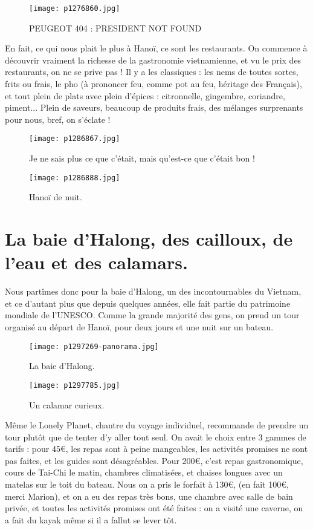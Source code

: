 \documentclass{book}
\begin{document}
\begin{figure}[h]
\centering
\texttt{[image: p1276860.jpg]}
\caption*{PEUGEOT 404 : PRESIDENT NOT FOUND}
\end{figure}

En fait, ce qui nous plait le plus à Hanoï, ce sont les restaurants. On commence à découvrir vraiment la richesse de la gastronomie vietnamienne, et vu le prix des restaurants, on ne se prive pas ! Il y a les classiques : les nems de toutes sortes, frits ou frais, le pho (à prononcer feu, comme pot au feu, héritage des Français), et tout plein de plats avec plein d'épices : citronnelle, gingembre, coriandre, piment... Plein de saveurs, beaucoup de produits frais, des mélanges surprenants pour nous, bref, on s'éclate !


\begin{figure}[h]
\centering
\texttt{[image: p1286867.jpg]}
\caption*{Je ne sais plus ce que c'était, mais qu'est-ce que c'était bon !}
\end{figure}


\begin{figure}[h]
\centering
\texttt{[image: p1286888.jpg]}
\caption*{Hanoï de nuit.}
\end{figure}



\chapter{La baie d'Halong, des cailloux, de l'eau et des calamars.}
Nous partîmes donc pour la baie d'Halong, un des incontournables du Vietnam, et ce d'autant plus que depuis quelques années, elle fait partie du patrimoine mondiale de l'UNESCO. Comme la grande majorité des gens, on prend un tour organisé au départ de Hanoï, pour deux jours et une nuit sur un bateau.


\begin{figure}[h]
\centering
\texttt{[image: p1297269-panorama.jpg]}
\caption*{La baie d'Halong.}
\end{figure}


\begin{wrapfigure}{l}{0.45\textwidth}
\centering
\texttt{[image: p1297785.jpg]}
\caption*{Un calamar curieux.}
\end{wrapfigure}

Même le Lonely Planet, chantre du voyage individuel, recommande de prendre un tour plutôt que de tenter d'y aller tout seul. On avait le choix entre 3 gammes de tarifs : pour 45\euro, les repas sont à peine mangeables, les activités promises ne sont pas faites, et les guides sont désagréables. Pour 200\euro, c'est repas gastronomique, cours de Tai-Chi le matin, chambres climatisées, et chaises longues avec un matelas sur le toit du bateau. Nous on a pris le forfait à 130\euro, (en fait 100\euro, merci Marion), et on a eu des repas très bons, une chambre avec salle de bain privée, et toutes les activités promises ont été faites : on a visité une caverne, on a fait du kayak même si il a fallut se lever tôt.
\end{document}
